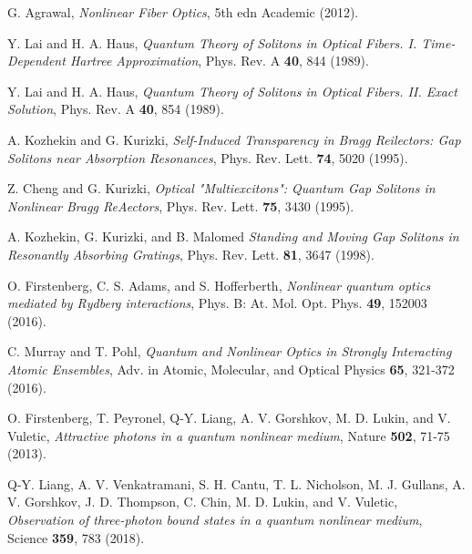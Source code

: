 \documentclass[pra,twocolumn,showpacs,preprintnumbers,amsmath,amssymb]{revtex4-1}
\begin{document}
\begin{thebibliography}{99}

 G. Agrawal,  \textit{Nonlinear Fiber Optics},   5th edn Academic (2012).  

 Y. Lai and H. A. Haus, \textit{Quantum Theory of Solitons in Optical Fibers. I. Time-Dependent Hartree Approximation}, Phys. Rev. A {\bf 40}, 844 (1989).


 Y. Lai and H. A. Haus, \textit{Quantum Theory of Solitons in Optical Fibers. II. Exact Solution}, Phys. Rev. A {\bf 40}, 854 (1989).

 A. Kozhekin and G. Kurizki, \textit{Self-Induced Transparency in Bragg Reilectors: Gap Solitons near Absorption Resonances}, Phys. Rev. Lett. {\bf 74}, 5020 (1995).

 Z. Cheng and G. Kurizki, \textit{Optical "Multiexcitons": Quantum Gap Solitons in Nonlinear Bragg ReAectors}, Phys. Rev. Lett. {\bf 75}, 3430 (1995).

 A. Kozhekin, G. Kurizki, and B. Malomed \textit{Standing and Moving Gap Solitons in Resonantly Absorbing Gratings}, Phys. Rev. Lett. {\bf 81}, 3647  (1998).



 O. Firstenberg, C. S. Adams, and S. Hofferberth,   \textit{Nonlinear quantum optics mediated by Rydberg interactions},  Phys. B: At. Mol. Opt. Phys.  {\bf 49}, 152003 (2016).

 C. Murray and T. Pohl, \textit{Quantum and Nonlinear Optics in Strongly Interacting Atomic Ensembles},  Adv.  in Atomic, Molecular, and Optical Physics   {\bf 65}, 321-372 (2016).






 O. Firstenberg, T. Peyronel, Q-Y. Liang, A. V. Gorshkov, M. D. Lukin, and V. Vuletic, \textit{Attractive photons in a quantum nonlinear medium},   Nature    {\bf 502}, 71-75 (2013).



 Q-Y. Liang, A. V. Venkatramani, S. H. Cantu, T. L. Nicholson, M. J. Gullans, A. V. Gorshkov, J. D. Thompson, C. Chin, M. D. Lukin, and V. Vuletic, \textit{Observation of three-photon bound states in a quantum nonlinear medium},   Science    {\bf 359}, 783 (2018).





\end{thebibliography}
\end{document}

